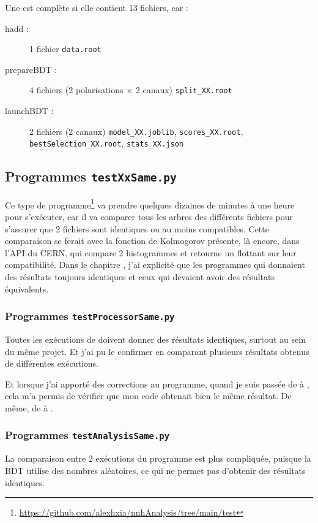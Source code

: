 Une \analysis est complète si elle contient 13 fichiers, car :
\begin{description}
	\item[hadd :] 1 fichier \verb|data.root|
	\item[prepareBDT :] 4 fichiers (2 polarisations $\times$ 2 canaux) \verb|split_XX.root| 
	\item[launchBDT :] 2 fichiers (2 canaux) \verb|model_XX.joblib|, \verb|scores_XX.root|, \verb|bestSelection_XX.root|, \verb|stats_XX.json|
\end{description}

\subsection{Programmes \texttt{testXxSame.py}}

Ce type de programme\footnote{\url{https://github.com/alexhxia/nnhAnalysis/tree/main/test}
} va prendre quelques dizaines de minutes à une heure pour s'exécuter, car il va comparer tous les arbres \ROOT des différents fichiers pour s'assurer que 2 fichiers sont identiques ou au moins compatibles. Cette comparaison se ferait avec la fonction de Kolmogorov présente, là encore, dans l'API du CERN, qui compare 2 histogrammes et retourne un flottant sur leur compatibilité. Dans le chapitre \original, j'ai explicité que les programmes qui donnaient des résultats toujours identiques et ceux qui devaient avoir des résultats équivalents. 

\subsubsection{Programmes \texttt{testProcessorSame.py}}

Toutes les exécutions de \processor doivent donner des résultats identiques, surtout au sein du même projet. Et j'ai pu le confirmer en comparant plusieurs résultats obtenus de différentes exécutions. 

Et lorsque j'ai apporté des corrections au programme, quand je suis passée de \original à \ilcsoft, cela m'a permis de vérifier que mon code obtenait bien le même résultat. De même, de \ilcsoft à \fcc.

\subsubsection{Programmes \texttt{testAnalysisSame.py}}

La comparaison entre 2 exécutions du programme \analysis est plus compliquée, puisque la BDT utilise des nombres aléatoires, ce qui ne permet pas d'obtenir des résultats identiques.

